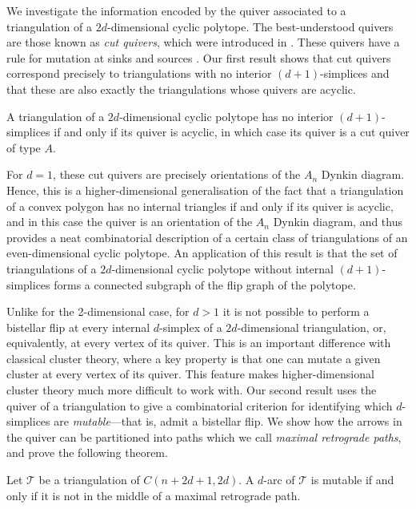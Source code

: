 \documentclass[ALCO,Unicode,published]{cedram}
\begin{document}
We investigate the information encoded by the quiver associated to a triangulation of a $2d$-dimensional cyclic polytope. The best-understood quivers are those known as \emph{cut quivers}, which were introduced in \cite{io}. These quivers have a rule for mutation at sinks and sources \cite{io}. Our first result shows that cut quivers correspond precisely to triangulations with no interior $(d + 1)$-simplices and that these are also exactly the triangulations whose quivers are acyclic.

\begin{theorem}\label{thm:intro:interior}
A triangulation of a $2d$-dimensional cyclic polytope has no interior $(d + 1)$-simplices if and only if its quiver is acyclic, in which case its quiver is a cut quiver of type $A$.
\end{theorem}

For $d = 1$, these cut quivers are precisely orientations of the $A_{n}$ Dynkin diagram. Hence, this is a higher-dimensional generalisation of the fact that a triangulation of a convex polygon has no internal triangles if and only if its quiver is acyclic, and in this case the quiver is an orientation of the $A_{n}$ Dynkin diagram, and thus provides a neat combinatorial description of a certain class of triangulations of an even-dimensional cyclic polytope. An application of this result is that the set of triangulations of a $2d$-dimensional cyclic polytope without internal $(d + 1)$-simplices forms a connected subgraph of the flip graph of the polytope.

Unlike for the 2-dimensional case, for $d > 1$ it is not possible to perform a bistellar flip at every internal $d$-simplex of a $2d$-dimensional triangulation, or, equivalently, at every vertex of its quiver. This is an important difference with classical cluster theory, where a key property is that one can mutate a given cluster at every vertex of its quiver. This feature makes higher-dimensional cluster theory much more difficult to work with. Our second result uses the quiver of a triangulation to give a combinatorial criterion for identifying which $d$-simplices are \emph{mutable}---that is, admit a bistellar flip. We show how the arrows in the quiver can be partitioned into paths which we call \emph{maximal retrograde paths}, and prove the following theorem.

\begin{theorem}\label{thm:intro:criterion}
Let $\mathcal{T}$ be a triangulation of $C(n + 2d + 1,2d)$. A $d$-arc of $\mathcal{T}$ is mutable if and only if it is not in the middle of a maximal retrograde path.
\end{theorem}
\end{document}
